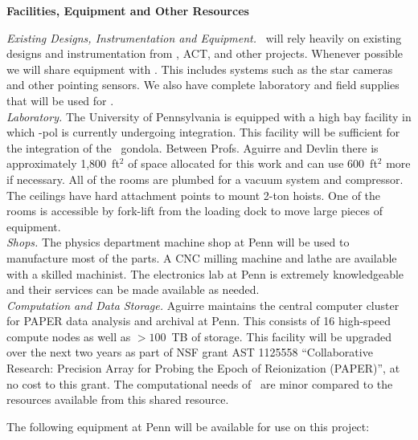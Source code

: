 \begin{center}
{\bf \large Facilities, Equipment and Other Resources}
\end{center}
\medskip
{}


{\it Existing Designs, Instrumentation and Equipment.}  \name\ will
rely heavily on existing designs and instrumentation from \blast, ACT,
and other projects.  Whenever possible we will share equipment with
\blast.  This includes systems such as the star cameras and other pointing 
sensors.  We also have complete laboratory and field supplies that
will be used for \name.\\

{\it Laboratory.} The University of Pennsylvania is equipped with a
high bay facility in which \blast-pol is currently undergoing
integration.  This facility will be sufficient for the integration of
the \name\ gondola.  Between Profs. Aguirre and Devlin there is
approximately 1,800~ft$^2$ of space allocated for this work and can
use 600~ft$^2$ more if necessary.  All of the rooms are plumbed for a
vacuum system and compressor.  The ceilings have hard attachment
points to mount 2-ton hoists.  One of the rooms is accessible by
fork-lift from the loading dock to move large pieces of equipment.\\

{\it Shops.} The physics department machine shop at Penn will be used
to manufacture most of the parts.  A CNC milling machine and lathe are
available with a skilled machinist.  The electronics lab at Penn is
extremely knowledgeable and their services can be made available as
needed.\\

{\it Computation and Data Storage.}  Aguirre maintains the central
computer cluster for PAPER data analysis and archival at Penn.  This
consists of 16 high-speed compute nodes as well as $>100$~TB of
storage.  This facility will be upgraded over the next two years as
part of NSF grant AST 1125558 ``Collaborative Research: Precision
Array for Probing the Epoch of Reionization (PAPER)'', at no cost to
this grant.  The computational needs of \name\ are minor compared to
the resources available from this shared resource.

The following equipment at Penn will be available for use on this
project:

